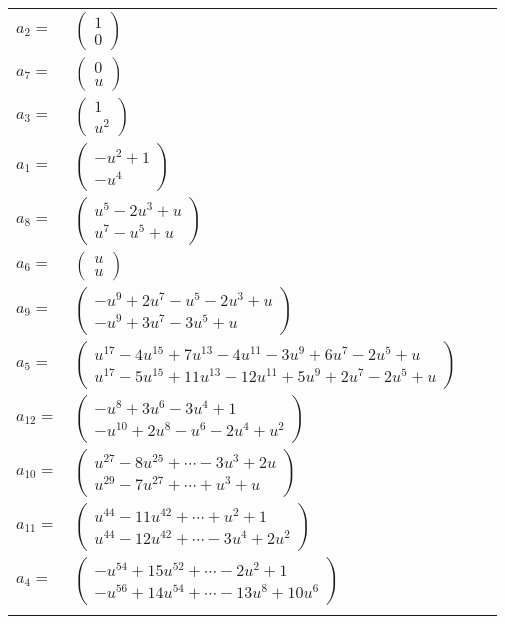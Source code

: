 \documentclass[1p]{elsarticle_modified}
\theoremstyle{definition}
\begin{document}
\begin{tabular}{m{7pt} m{180pt} m{7pt} m{180pt} }
\flushright $a_{2}=$&$\begin{pmatrix}1\\0\end{pmatrix}$ \\
\flushright $a_{7}=$&$\begin{pmatrix}0\\u\end{pmatrix}$ \\
\flushright $a_{3}=$&$\begin{pmatrix}1\\u^2\end{pmatrix}$ \\
\flushright $a_{1}=$&$\begin{pmatrix}- u^2+1\\- u^4\end{pmatrix}$ \\
\flushright $a_{8}=$&$\begin{pmatrix}u^5-2 u^3+u\\u^7- u^5+u\end{pmatrix}$ \\
\flushright $a_{6}=$&$\begin{pmatrix}u\\u\end{pmatrix}$ \\
\flushright $a_{9}=$&$\begin{pmatrix}- u^9+2 u^7- u^5-2 u^3+u\\- u^9+3 u^7-3 u^5+u\end{pmatrix}$ \\
\flushright $a_{5}=$&$\begin{pmatrix}u^{17}-4 u^{15}+7 u^{13}-4 u^{11}-3 u^9+6 u^7-2 u^5+u\\u^{17}-5 u^{15}+11 u^{13}-12 u^{11}+5 u^9+2 u^7-2 u^5+u\end{pmatrix}$ \\
\flushright $a_{12}=$&$\begin{pmatrix}- u^8+3 u^6-3 u^4+1\\- u^{10}+2 u^8- u^6-2 u^4+u^2\end{pmatrix}$ \\
\flushright $a_{10}=$&$\begin{pmatrix}u^{27}-8 u^{25}+\cdots-3 u^3+2 u\\u^{29}-7 u^{27}+\cdots+u^3+u\end{pmatrix}$ \\
\flushright $a_{11}=$&$\begin{pmatrix}u^{44}-11 u^{42}+\cdots+u^2+1\\u^{44}-12 u^{42}+\cdots-3 u^4+2 u^2\end{pmatrix}$ \\
\flushright $a_{4}=$&$\begin{pmatrix}- u^{54}+15 u^{52}+\cdots-2 u^2+1\\- u^{56}+14 u^{54}+\cdots-13 u^8+10 u^6\end{pmatrix}$\\&\end{tabular}
\end{document}
